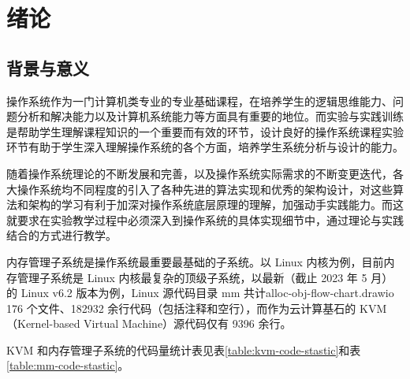 \documentclass[AutoFakeBold]{LZUThesis}
\begin{document}
\begin{sloppypar}


\mainmatter

\chapter{绪论}


\section{背景与意义}

操作系统作为一门计算机类专业的专业基础课程，在培养学生的逻辑思维能力、问题分析和解决能力以及计算机系统能力等方面具有重要的地位。而实验与实践训练是帮助学生理解课程知识的一个重要而有效的环节，设计良好的操作系统课程实验环节有助于学生深入理解操作系统的各个方面，培养学生系统分析与设计的能力。

随着操作系统理论的不断发展和完善，以及操作系统实际需求的不断变更迭代，各大操作系统均不同程度的引入了各种先进的算法实现和优秀的架构设计，对这些算法和架构的学习有利于加深对操作系统底层原理的理解，加强动手实践能力。而这就要求在实验教学过程中必须深入到操作系统的具体实现细节中，通过理论与实践结合的方式进行教学。

内存管理子系统是操作系统最重要最基础的子系统。以 Linux
内核为例，目前内存管理子系统是 Linux
内核最复杂的顶级子系统，以最新（截止 2023 年 5 月）的 Linux v6.2
版本为例，Linux 源代码目录 mm 共计alloc-obj-flow-chart.drawio 176 个文件、182932
余行代码（包括注释和空行），而作为云计算基石的 KVM（Kernel-based Virtual
Machine）源代码仅有 9396 余行。

KVM 和内存管理子系统的代码量统计表见表\ref{table:kvm-code-stastic}和表\ref{table:mm-code-stastic}。


\end{sloppypar}
\end{document}
